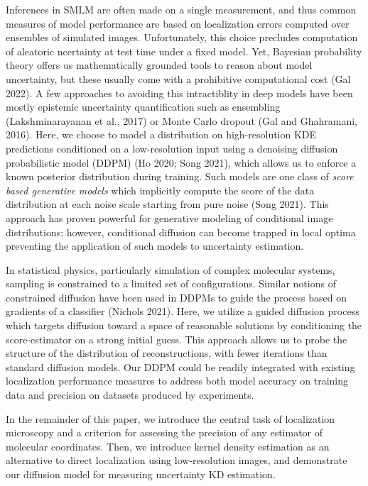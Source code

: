 \documentclass{article}
\begin{document}
Inferences in SMLM are often made on a single measurement, and thus common measures of model performance are based on localization errors computed over ensembles of simulated images. Unfortunately, this choice precludes computation of aleatoric ncertainty at test time under a fixed model. Yet, Bayesian probability theory offers us mathematically grounded tools to reason about model uncertainty, but these usually come with a prohibitive computational cost (Gal 2022). A few approaches to avoiding this intractiblity in deep models have been mostly epistemic uncertainty quantification such as ensembling (Lakshminarayanan et al., 2017) or Monte Carlo dropout (Gal and Ghahramani, 2016). Here, we choose to model a distribution on high-resolution KDE predictions conditioned on a low-resolution input using a denoising diffusion probabilistic model (DDPM) (Ho 2020; Song 2021), which allows us to enforce a known posterior distribution during training. Such models are one class of \emph{score based generative models} which implicitly compute the score of the data distribution at each noise scale starting from pure noise (Song 2021). This approach has proven powerful for generative modeling of conditional image distributions; however, conditional diffusion can become trapped in local optima preventing the application of such models to uncertainty estimation.

In statistical physics, particularly simulation of complex molecular systems, sampling is constrained to a limited set of configurations. Similar notions of constrained diffusion have been used in DDPMs to guide the process based on gradients of a classifier (Nichols 2021). Here, we utilize a guided diffusion process which targets diffusion toward a space of reasonable solutions by conditioning the score-estimator on a strong initial guess. This approach allows us to probe the structure of the distribution of reconstructions, with fewer iterations than standard diffusion models. Our DDPM could be readily integrated with existing localization performance measures to address both model accuracy on training data and precision on datasets produced by experiments. 

In the remainder of this paper, we introduce the central task of localization microscopy and a criterion for assessing the precision of any estimator of molecular coordinates. Then, we introduce kernel density estimation as an alternative to direct localization using low-resolution images, and demonstrate our diffusion model for measuring uncertainty KD estimation. 
\end{document}
